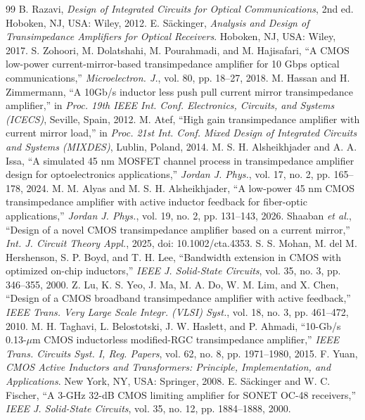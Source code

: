 \documentclass[11pt,a4paper]{article}
\begin{document}
\begin{thebibliography}{99}
 B. Razavi, \emph{Design of Integrated Circuits for Optical Communications}, 2nd ed. Hoboken, NJ, USA: Wiley, 2012.
 E. S\"ackinger, \emph{Analysis and Design of Transimpedance Amplifiers for Optical Receivers}. Hoboken, NJ, USA: Wiley, 2017.
 S. Zohoori, M. Dolatshahi, M. Pourahmadi, and M. Hajisafari, ``A CMOS low-power current-mirror-based transimpedance amplifier for 10 Gbps optical communications,'' \emph{Microelectron. J.}, vol. 80, pp. 18--27, 2018.
 M. Hassan and H. Zimmermann, ``A 10Gb/s inductor less push pull current mirror transimpedance amplifier,'' in \emph{Proc. 19th IEEE Int. Conf. Electronics, Circuits, and Systems (ICECS)}, Seville, Spain, 2012.
 M. Atef, ``High gain transimpedance amplifier with current mirror load,'' in \emph{Proc. 21st Int. Conf. Mixed Design of Integrated Circuits and Systems (MIXDES)}, Lublin, Poland, 2014.
 M. S. H. Alsheikhjader and A. A. Issa, ``A simulated 45 nm MOSFET channel process in transimpedance amplifier design for optoelectronics applications,'' \emph{Jordan J. Phys.}, vol. 17, no. 2, pp. 165--178, 2024.
 M. M. Alyas and M. S. H. Alsheikhjader, ``A low-power 45 nm CMOS transimpedance amplifier with active inductor feedback for fiber-optic applications,'' \emph{Jordan J. Phys.}, vol. 19, no. 2, pp. 131--143, 2026.
 Shaaban \emph{et al.}, ``Design of a novel CMOS transimpedance amplifier based on a current mirror,'' \emph{Int. J. Circuit Theory Appl.}, 2025, doi: 10.1002/cta.4353.
 S. S. Mohan, M. del M. Hershenson, S. P. Boyd, and T. H. Lee, ``Bandwidth extension in CMOS with optimized on-chip inductors,'' \emph{IEEE J. Solid-State Circuits}, vol. 35, no. 3, pp. 346--355, 2000.
 Z. Lu, K. S. Yeo, J. Ma, M. A. Do, W. M. Lim, and X. Chen, ``Design of a CMOS broadband transimpedance amplifier with active feedback,'' \emph{IEEE Trans. Very Large Scale Integr. (VLSI) Syst.}, vol. 18, no. 3, pp. 461--472, 2010.
 M. H. Taghavi, L. Belostotski, J. W. Haslett, and P. Ahmadi, ``10-Gb/s 0.13-$\mu$m CMOS inductorless modified-RGC transimpedance amplifier,'' \emph{IEEE Trans. Circuits Syst. I, Reg. Papers}, vol. 62, no. 8, pp. 1971--1980, 2015.
 F. Yuan, \emph{CMOS Active Inductors and Transformers: Principle, Implementation, and Applications}. New York, NY, USA: Springer, 2008.
 E. S\"ackinger and W. C. Fischer, ``A 3-GHz 32-dB CMOS limiting amplifier for SONET OC-48 receivers,'' \emph{IEEE J. Solid-State Circuits}, vol. 35, no. 12, pp. 1884--1888, 2000.

\end{thebibliography}
\end{document}
